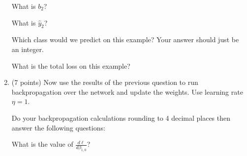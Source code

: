 \documentclass[11pt]{exam}
\numberwithin{equation}{section} %
\numberwithin{figure}{section} %
\numberwithin{table}{section} %
\begin{document}
\begin{enumerate}
\begin{questions}
	        
	        \question[1] What is $b_2$?
	        
	        \begin{tcolorbox}[fit,height=1cm, width=2cm, blank, borderline={1pt}{-2pt}]
	        \end{tcolorbox}
	        
	        
	        
	        \question[1] What is $\hat{y}_2$?
	        
	        \begin{tcolorbox}[fit,height=1cm, width=2cm, blank, borderline={1pt}{-2pt}]
	        \end{tcolorbox}
	        
	        
	        \question[1] Which class would we predict on this example? Your answer should just be an integer.
	        
	        \begin{tcolorbox}[fit,height=1cm, width=2cm, blank, borderline={1pt}{-2pt}]
	        \end{tcolorbox}
	        
	        
	        \question[1] What is the total loss on this example?
	        
	        \begin{tcolorbox}[fit,height=1cm, width=2cm, blank, borderline={1pt}{-2pt}]
	        \end{tcolorbox}
	        
	    \end{questions}
	    
	    \clearpage
	\item (7 points) Now use the results of the previous question to run backpropagation over the network and update the weights. Use learning rate $\eta=1$. 
	    
	    Do your backpropagation calculations rounding to 4 decimal places then answer the following questions: 
	    
	     \begin{questions}
	        \question[1] What is the value of $\frac{d\ell}{d\beta_{1,0}}$?
	        
	        \begin{tcolorbox}[fit,height=1cm, width=2cm, blank, borderline={1pt}{-2pt}]
	        \end{tcolorbox}
	        
	     
	     

\end{questions}
\end{enumerate}
\end{document}

